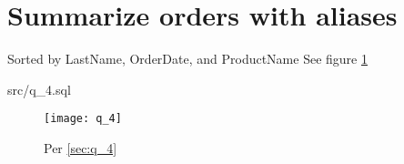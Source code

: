 \documentclass{article}
\begin{document}
\section{Summarize orders with aliases}
Sorted by LastName, OrderDate, and ProductName
See figure \ref{fig:q_4}
\label{sec:q_4}
\begin{lstinputlisting}[float]{src/q_4.sql}
\end{lstinputlisting}
\begin{figure}[H]\centering
	\caption{Per \ref{sec:q_4}}
	\texttt{[image: q\_4]}
	\label{fig:q_4}
\end{figure}
%
%
%
%
%
%
%
%
%
%
\end{document}
